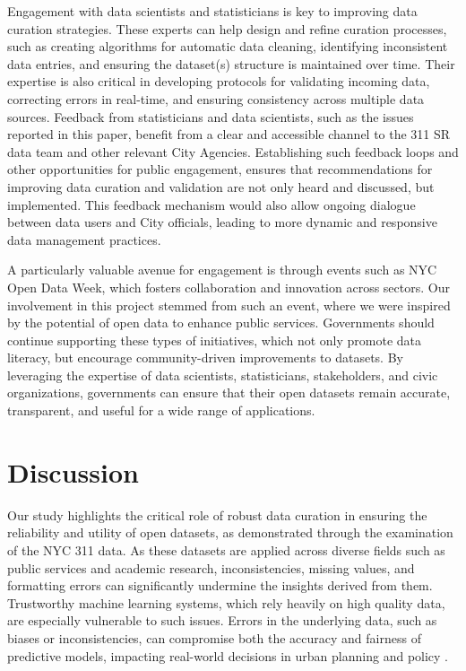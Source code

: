 \documentclass[linenumber]{jdsart}
\begin{document}
Engagement with data scientists and statisticians is key to improving 
data curation strategies. These experts can help design and refine 
curation processes, such as creating algorithms for automatic data 
cleaning, identifying inconsistent data entries, and ensuring the 
dataset(s) structure is maintained over time. Their expertise is also 
critical in developing protocols for validating incoming data, correcting 
errors in real\mbox{-}time, and ensuring consistency across multiple data sources. 
Feedback from statisticians and data scientists, such as the issues reported 
in this paper, benefit from a clear and accessible channel to the 311 SR data 
team and other relevant City Agencies. Establishing such feedback loops 
and other opportunities for public engagement, ensures that 
recommendations for improving data curation and validation 
are not only heard and discussed, but implemented. This feedback 
mechanism would also allow ongoing dialogue between 
data users and City officials, leading to more dynamic 
and responsive data management practices.


A particularly valuable avenue for engagement is through events such as NYC 
Open Data Week, which fosters collaboration and innovation across sectors. 
Our involvement in this project stemmed from such an event, where we were 
inspired by the potential of open data to enhance public services. Governments 
should continue supporting these types of initiatives, which not only promote 
data literacy, but encourage community\mbox{-}driven improvements to datasets. 
By leveraging the expertise of data scientists, statisticians, stakeholders, 
and civic organizations, governments can ensure that their open datasets 
remain accurate, transparent, and useful for a wide range of applications.


\section{Discussion} 
\label{sec:discussion}
Our study highlights the critical role of robust data curation in
ensuring the reliability and utility of open datasets, as demonstrated
through the examination of the NYC 311 data. As these datasets are
applied across diverse fields such as public services and academic
research, inconsistencies, missing values, and formatting errors can
significantly undermine the insights derived from them. Trustworthy
machine learning systems, which rely heavily on high quality data, are
especially vulnerable to such issues. Errors in the underlying data,
such as biases or inconsistencies, can compromise both the accuracy
and fairness of predictive models, impacting real\mbox{-}world decisions in
urban planning and policy \citep{rahm2000data, geiger2020garbage}.
\end{document}
